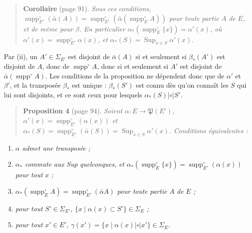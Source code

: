 \documentclass[11pt,a4paper]{article}
\begin{document}
\begin{quote}
\textbf{Corollaire} (page 91). \emph{Sous ces conditions,
$\operatorname{supp}^{\circ}_{E'}(\bar\alpha(A)) =
\operatorname{supp}^{\circ}_{E'}(\bar\alpha(\operatorname{supp}^{\circ}_{E}A))$
pour toute partie $A$ de $E$, et de même pour $\beta$. En particulier
$\alpha_{*}(\operatorname{supp}^{\circ}_{E}\{x\}) = \alpha'(x)$, où $\alpha'(x) =
\operatorname{supp}^{\circ}_{E'}\alpha(x)$, et $\alpha_{*}(S) =
\operatorname{Sup}_{x \in S}\alpha'(x)$.}
\end{quote}

Par (ii), un $A' \in \Sigma_{E'}$ est disjoint de $\bar\alpha(A)$ si et
seulement si $\beta_{*}(A')$ est disjoint de $A$, donc de
$\operatorname{supp}^{\circ}A$, donc si et seulement si $A'$ est disjoint de
$\bar\alpha(\operatorname{supp}^{\circ}A)$. Les conditions de la proposition ne
dépendent donc que de $\alpha'$ et $\beta'$, et la transposée $\beta_{*}$ est
unique : $\beta_{*}(S')$ est connu dès qu'on connaît les $S$ qui lui sont
disjoints, et ce sont ceux pour lesquels $\alpha_{*}(S) \mathrel{|\circ|} S'$.

\begin{quote}
\textbf{Proposition 4} (page 94). \emph{Soient $\alpha : E \to \mathfrak{P}(E')$,
$\alpha'(x) = \operatorname{supp}^{\circ}_{E'}(\alpha(x))$ et $\alpha_{*}(S) =
\operatorname{supp}^{\circ}_{E'}(\bar\alpha(S)) = \operatorname{Sup}_{x \in
S}\alpha'(x)$. Conditions équivalentes :}
\end{quote}
\begin{enumerate}
\item[(i)] \emph{$\alpha$ admet une transposée ;}
\item[(ii)] \emph{$\alpha_{*}$ commute aux Sup quelconques, et
$\alpha_{*}(\operatorname{supp}^{\circ}_{E}\{x\}) =
\operatorname{supp}^{\circ}_{E'}(\alpha(x))$ pour tout $x$ ;}
\item[(iii)] \emph{$\alpha_{*}(\operatorname{supp}^{\circ}_{E}A) =
\operatorname{supp}^{\circ}_{E'}(\bar\alpha A)$ pour toute partie $A$ de $E$ ;}
\item[(iv)] \emph{pour tout $S' \in \Sigma_{E'}$, $\{x \mid \alpha(x) \subset
S'\} \in \Sigma_{E}$ ;}
\item[(v)] \emph{pour tout $x' \in E'$, $\gamma(x') = \{x \mid \alpha(x)
\mathrel{|\circ|} x'\} \in \Sigma_{E}$.}
\end{enumerate}
\end{document}
